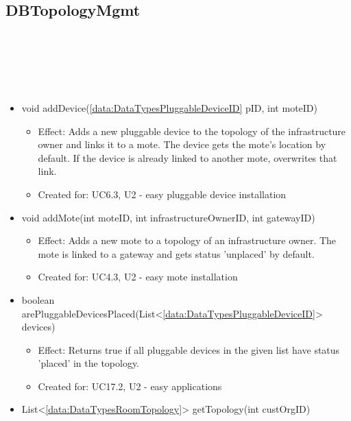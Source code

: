   \subsection{DBTopologyMgmt}\label{int:DeviceDatabaseDeviceDBDBTopologyMgmt}
    \begin{description}
      \item[Provided by:] \iconcomponent{}~
      \item[Required by:] \iconcomponent{}~
      \item[Operations:] ~
    \begin{itemize}[noitemsep,nolistsep,leftmargin=-.25cm]
      \item \textsf{void addDevice(\ref{data:DataTypesPluggableDeviceID} pID, int moteID)}
        \begin{itemize}[noitemsep,nolistsep]
           \item Effect: Adds a new pluggable device to the topology of the infrastructure owner and links it to a mote. The device gets the mote's location by default. If the device is already linked to another mote, overwrites that link.
\item Created for: UC6.3, U2 - easy pluggable device installation
        \end{itemize}
      \item \textsf{void addMote(int moteID, int infrastructureOwnerID, int gatewayID)}
        \begin{itemize}[noitemsep,nolistsep]
           \item Effect: Adds a new mote to a topology of an infrastructure owner. The mote is linked to a gateway and gets status 'unplaced' by default.
\item Created for: UC4.3, U2 - easy mote installation
        \end{itemize}
      \item \textsf{boolean arePluggableDevicesPlaced(List\textless{}\ref{data:DataTypesPluggableDeviceID}\textgreater{} devices)}
        \begin{itemize}[noitemsep,nolistsep]
           \item Effect: Returns true if all pluggable devices in the given list have status 'placed' in the topology.
\item Created for: UC17.2, U2 - easy applications
        \end{itemize}
      \item \textsf{List\textless{}\ref{data:DataTypesRoomTopology}\textgreater{} getTopology(int custOrgID)}

\end{itemize}
\end{description}
